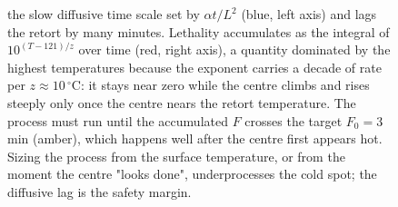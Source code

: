 \begin{figure}[htbp]
{the slow diffusive time scale set by $\alpha t/L^{2}$ (blue, left
axis) and lags the retort by many minutes. Lethality accumulates as
the integral of $10^{(T-121)/z}$ over time (red, right axis), a
quantity dominated by the highest temperatures because the exponent
carries a decade of rate per $z \approx 10\,{}^{\circ}\mathrm{C}$: it
stays near zero while the centre climbs and rises steeply only once
the centre nears the retort temperature. The process must run until
the accumulated $F$ crosses the target $F_{0} = 3$ min (amber),
which happens well after the centre first appears hot. Sizing the
process from the surface temperature, or from the moment the centre
"looks done", underprocesses the cold spot; the diffusive lag is the
safety margin.}
\label{fig:vol02:ch12:sterilization}
\end{figure}
